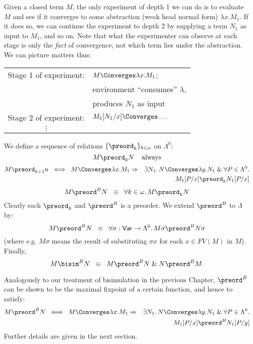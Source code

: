 Given a closed term $M$, the only experiment of depth 1 we can do is to evaluate $M$ and see if it converges to some abstraction (weak head normal form) $\lambda x . M_{1}$. If it does so, we can continue the experiment to depth 2 by supplying a term $N_{1}$ as input to $M_{1}$, and so on. Note that what the experimenter can observe at each stage is only the {\em fact} of convergence, not which term lies under the abstraction. 
We can picture matters thus:
\begin{center}
\begin{tabular}{cl}
Stage 1 of experiment: & $M \Converges \lambda x . M_{1}$; \\
& environment ``consumes'' $\lambda$, \\
& produces $N_{1}$ as input \\
Stage 2 of experiment: & $M_{1}[N_{1}/x] \Converges \ldots$ \\
$\vdots$ &
\end{tabular}
\end{center}
\begin{definition}
{\rm We define a sequence of relations $\{ \preord_{k} \}_{k \in \omega}$ on $\Lambda^{0}$:
\[ M \preord_{0} N \;\;\;\; {\rm always} \]
\begin{eqnarray*}
M \preord_{k+1} n \;\; \Longleftrightarrow \;\; M \Converges \lambda x . M_{1} & \Rightarrow & \exists N_{1}. \, N \Converges \lambda y . N_{1} \; \& \; \forall P \in \Lambda^{0}. \\
& & M_{1}[P/x] \preord_{k} N_{1}[P/x]
\end{eqnarray*}
\[ M \preord^{B} N \;\; \equiv \;\; \forall k \in \omega . \, M \preord_{k} N \]
Clearly each $\preord_{k}$ and $\preord^{B}$ is a preorder. We extend $\preord^{B}$ to $\Lambda$ by:
\[ M \preord^{B} N \;\; \equiv \;\; \forall \sigma : {\sf Var} \rightarrow \Lambda^{0}. \, M \sigma \preord^{B} N \sigma \]
(where e.g. $M \sigma$ means the result of substituting $\sigma x$ for each $x \in FV(M)$ in $M$). Finally,}
\[ M \bisim^{B} N \;\; \equiv \;\; M \preord^{B} N \; \& \; N \preord^{B} M. \]
\end{definition}
Analogously to our treatment of bisimulation in the previous Chapter, $\preord^{B}$ can be shown to be the maximal fixpoint of a certain function, and hence to satisfy:
\begin{eqnarray*}
M \preord^{B} N \;\; \Longleftrightarrow \;\; M \Converges \lambda x . M_{1} & \Rightarrow & \exists N_{1}. \, N \Converges \lambda y . N_{1} \; \& \; \forall P \in \Lambda^{0}. \\
& & M_{1}[P/x] \preord^{B} N_{1}[P/y]
\end{eqnarray*}
Further details are given in the next section.

